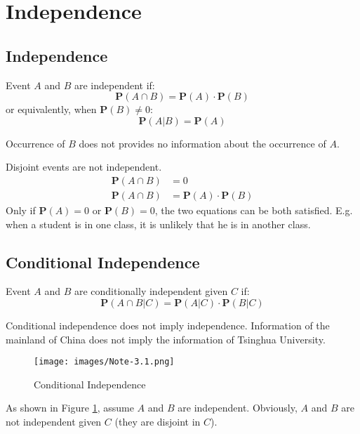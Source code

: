 \section{Independence}
\subsection{Independence}
\begin{definition}[Independence]
    Event $A$ and $B$ are independent if:
    \begin{equation}
        \mathbf{P}(A \cap B) = \mathbf{P}(A) \cdot \mathbf{P}(B)
    \end{equation}
    or equivalently, when $\mathbf{P}(B) \neq 0$:
    \begin{equation}
        \mathbf{P}(A|B) = \mathbf{P}(A)
    \end{equation}
\end{definition}
Occurrence of $B$ does not provides no information about the occurrence of $A$.
\begin{remark}
    Disjoint events are not independent.
    \begin{equation}
    \begin{aligned}
        \mathbf{P}(A \cap B) &= 0 \\
        \mathbf{P}(A \cap B) &= \mathbf{P}(A) \cdot \mathbf{P}(B)
    \end{aligned}
    \end{equation}
    Only if $\mathbf{P}(A) = 0$ or $\mathbf{P}(B) = 0$, the two equations can be both satisfied. E.g. when a student is in one class, it is unlikely that he is in another class.
\end{remark}

\subsection{Conditional Independence}
\begin{definition}
    Event $A$ and $B$ are conditionally independent given $C$ if:
    \begin{equation}
        \mathbf{P}(A \cap B | C) = \mathbf{P}(A | C) \cdot \mathbf{P}(B | C)
    \end{equation}
\end{definition}
\begin{remark}
    Conditional independence does not imply independence. Information of the mainland of China does not imply the information of Tsinghua University.
\begin{figure}[H]
    \centering
    \texttt{[image: images/Note-3.1.png]}
    \caption{Conditional Independence}
    \label{fig:conditional-independence}
\end{figure}
As shown in Figure \ref{fig:conditional-independence}, assume $A$ and $B$ are independent. Obviously, $A$ and $B$ are not independent given $C$ (they are disjoint in $C$).
\end{remark}

